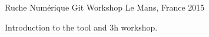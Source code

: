 \begin{cventries}

  \cventry
    {Ruche Numérique} %
    {Git Workshop} %
    {Le Mans, France} %
    {2015} %
    {
      \begin{cvitems} %
			\item {Introduction to the tool and 3h workshop.}
      \end{cvitems}
    }



\end{cventries}
